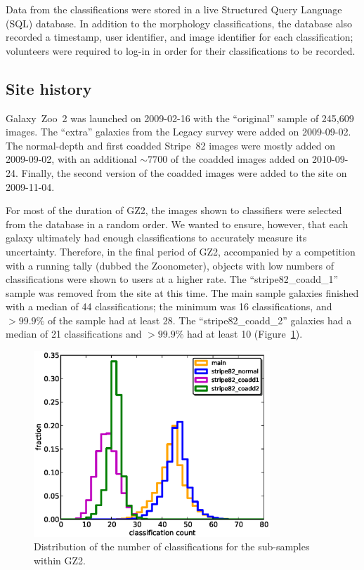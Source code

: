 \documentclass[useAMS,usenatbib]{mn2e}
\begin{document}
Data from the classifications were stored in a live Structured Query Language (SQL) database. In addition to the morphology classifications, the database also recorded a timestamp, user identifier, and image identifier for each classification; volunteers were required to log-in in order for their classifications to be recorded. 

\subsection{Site history}\label{ssec-site_history}

Galaxy~Zoo~2 was launched on 2009-02-16 with the ``original'' sample of 245,609 images. The ``extra'' galaxies from the Legacy survey were added on 2009-09-02. The normal-depth and first coadded Stripe~82 images were mostly added on 2009-09-02, with an additional $\sim7700$ of the coadded images added on 2010-09-24. Finally, the second version of the coadded images were added to the site on 2009-11-04. 

For most of the duration of GZ2, the images shown to classifiers were selected from the database in a random order. We wanted to ensure, however, that each galaxy ultimately had enough classifications to accurately measure its uncertainty. Therefore, in the final period of GZ2, accompanied by a competition with a running tally (dubbed the Zoonometer), objects with low numbers of classifications were shown to users at a higher rate. The ``stripe82\_coadd\_1'' sample was removed from the site at this time. The main sample galaxies finished with a median of 44 classifications; the minimum was 16 classifications, and $>99.9\%$ of the sample had at least 28. The ``stripe82\_coadd\_2'' galaxies had a median of 21 classifications and $>99.9\%$ had at least 10 (Figure~\ref{fig-classification_histogram}).

\begin{figure}
\includegraphics[angle=0,width=3.5in]{figures/classification_histogram.eps}
\caption{Distribution of the number of classifications for the sub-samples within GZ2.
\label{fig-classification_histogram}}
\end{figure}
\end{document}
